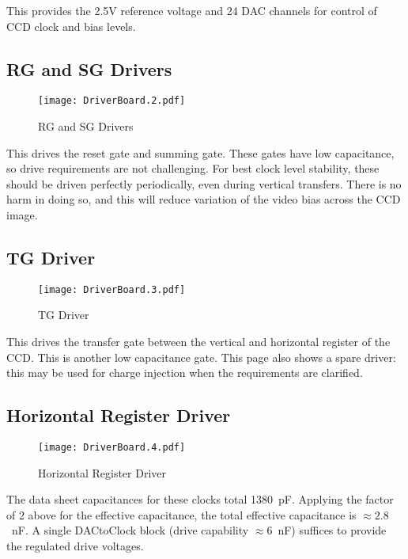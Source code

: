 \documentclass[a4paper,12pt]{article}
\begin{document}
This provides the 2.5V reference voltage and 24 DAC channels for control of CCD clock and bias levels.
  

\subsection{RG and SG Drivers}
   \begin{figure}
   \begin{center}
   \texttt{[image: DriverBoard.2.pdf]}
   \end{center}
   \caption{RG and SG Drivers}
   \end{figure}

This drives the reset gate and summing gate. These gates have low capacitance, so drive requirements are not challenging. For best clock level stability, these should be driven perfectly periodically, even during vertical transfers. There is no harm in doing so, and this will reduce variation of the video bias across the CCD image.
  

\subsection{TG Driver}
   \begin{figure}
   \begin{center}
   \texttt{[image: DriverBoard.3.pdf]}
   \end{center}
   \caption{TG Driver}
   \end{figure}
   
This drives the transfer gate between the vertical and horizontal register of the CCD. This is another low capacitance gate. This page also shows a spare driver: this may be used for charge injection when the requirements are clarified.
  

\subsection{Horizontal Register Driver}
   \begin{figure}
   \begin{center}
   \texttt{[image: DriverBoard.4.pdf]}
   \end{center}
   \caption{Horizontal Register Driver}
   \end{figure}
   
The data sheet capacitances for these clocks total 1380\ pF. Applying the factor of 2 above for the effective capacitance, the total effective capacitance is $\approx 2.8$\ nF. A single DACtoClock block (drive capability $\approx 6$\ nF) suffices to provide the regulated drive voltages.
  
\end{document}

